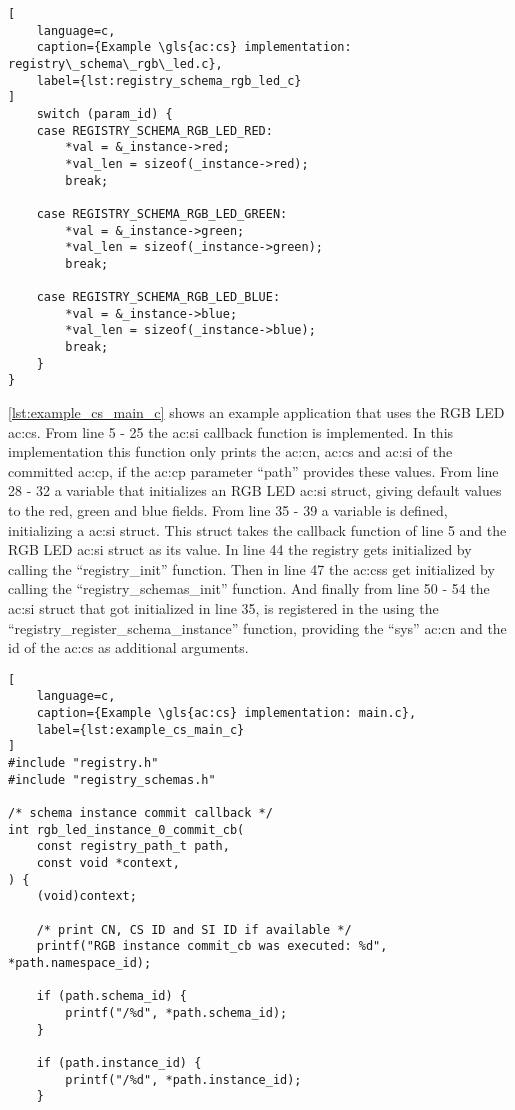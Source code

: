 {\begin{lstlisting}[
    language=c,
    caption={Example \gls{ac:cs} implementation: registry\_schema\_rgb\_led.c},
    label={lst:registry_schema_rgb_led_c}
]
    switch (param_id) {
    case REGISTRY_SCHEMA_RGB_LED_RED:
        *val = &_instance->red;
        *val_len = sizeof(_instance->red);
        break;

    case REGISTRY_SCHEMA_RGB_LED_GREEN:
        *val = &_instance->green;
        *val_len = sizeof(_instance->green);
        break;

    case REGISTRY_SCHEMA_RGB_LED_BLUE:
        *val = &_instance->blue;
        *val_len = sizeof(_instance->blue);
        break;
    }
}
\end{lstlisting}

\autoref{lst:example_cs_main_c} shows an example application that uses the RGB LED \gls{ac:cs}.
From line 5 - 25 the \gls{ac:si} callback function is implemented.
In this implementation this function only prints the \gls{ac:cn}, \gls{ac:cs} and \gls{ac:si} of the committed \gls{ac:cp}, if the \gls{ac:cp} parameter ``path'' provides these values.
From line 28 - 32 a variable that initializes an RGB LED \gls{ac:si} struct, giving default values to the red, green and blue fields.
From line 35 - 39 a variable is defined, initializing a  \gls{ac:si} struct.
This struct takes the callback function of line 5 and the RGB LED \gls{ac:si} struct as its value.
In line 44 the registry gets initialized by calling the ``registry\_init'' function.
Then in line 47 the \glspl{ac:cs} get initialized by calling the ``registry\_schemas\_init'' function. And finally from line 50 - 54 the  \gls{ac:si} struct that got initialized in line 35, is registered in the  using the ``registry\_register\_schema\_instance'' function, providing the ``sys'' \gls{ac:cn} and the id of the \gls{ac:cs} as additional arguments.

\begin{lstlisting}[
    language=c,
    caption={Example \gls{ac:cs} implementation: main.c},
    label={lst:example_cs_main_c}
]
#include "registry.h"
#include "registry_schemas.h"

/* schema instance commit callback */
int rgb_led_instance_0_commit_cb(
    const registry_path_t path,
    const void *context,
) {
    (void)context;

    /* print CN, CS ID and SI ID if available */
    printf("RGB instance commit_cb was executed: %d", *path.namespace_id);
    
    if (path.schema_id) {
        printf("/%d", *path.schema_id);
    }

    if (path.instance_id) {
        printf("/%d", *path.instance_id);
    }
    

\end{lstlisting}}
